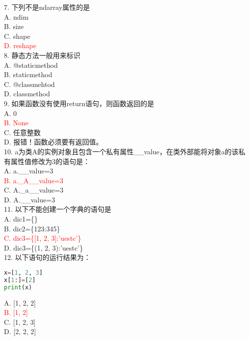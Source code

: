 \documentclass[6pt]{article}
\begin{document}
7. 下列不是ndarray属性的是\\

A. ndim\\
B. size\\
C. shape\\
\textcolor{red}{D. reshape}\\

8. 静态方法一般用来标识\\

A. @staticmethod\\
B. staticmethod\\
C. @classmehtod\\
D. classmethod\\

9. 如果函数没有使用return语句，则函数返回的是\\

A. 0\\
		\textcolor{red}{B. None}\\
C. 任意整数\\
D. 报错！函数必须要有返回值。\\

10. a为类A的实例对象且包含一个私有属性\_\_value，在类外部能将对象a的该私有属性值修改为3的语句是：\\

A. a.\_\_value=3\\
\textcolor{red}{B. a.\_A\_\_value=3}\\
C. A.\_a\_\_value=3\\
D. A.\_\_value=3\\

11. 以下不能创建一个字典的语句是\\

A. dic1=\{\}\\
B. dic2=\{123:345\}\\
\textcolor{red}{C. dic3=\{[1, 2, 3]:’uestc’\}}\\
D. dic3=\{(1, 2, 3):’uestc’\}\\

12. 以下语句的运行结果为：\\

\begin{lstlisting}[language=Python]
x=[1, 2, 3]
x[1:]=[2]
print(x) 
\end{lstlisting}
A. [1, 2, 2]\\
\textcolor{red}{B. [1, 2]}\\
C. [1, 2, 3]\\
D. [2, 2, 2]\\
\end{document}
